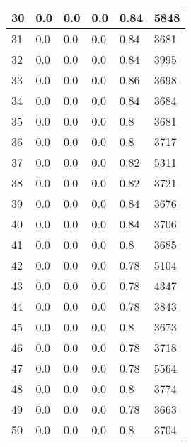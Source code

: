 \begin{longtable}{|l|l|l|l|l|l|}
30 & 0.0 & 0.0 & 0.0 & 0.84 & 5848 \\ \hline 
31 & 0.0 & 0.0 & 0.0 & 0.84 & 3681 \\ \hline 
32 & 0.0 & 0.0 & 0.0 & 0.84 & 3995 \\ \hline 
33 & 0.0 & 0.0 & 0.0 & 0.86 & 3698 \\ \hline 
34 & 0.0 & 0.0 & 0.0 & 0.84 & 3684 \\ \hline 
35 & 0.0 & 0.0 & 0.0 & 0.8 & 3681 \\ \hline 
36 & 0.0 & 0.0 & 0.0 & 0.8 & 3717 \\ \hline 
37 & 0.0 & 0.0 & 0.0 & 0.82 & 5311 \\ \hline 
38 & 0.0 & 0.0 & 0.0 & 0.82 & 3721 \\ \hline 
39 & 0.0 & 0.0 & 0.0 & 0.84 & 3676 \\ \hline 
40 & 0.0 & 0.0 & 0.0 & 0.84 & 3706 \\ \hline 
41 & 0.0 & 0.0 & 0.0 & 0.8 & 3685 \\ \hline 
42 & 0.0 & 0.0 & 0.0 & 0.78 & 5104 \\ \hline 
43 & 0.0 & 0.0 & 0.0 & 0.78 & 4347 \\ \hline 
44 & 0.0 & 0.0 & 0.0 & 0.78 & 3843 \\ \hline 
45 & 0.0 & 0.0 & 0.0 & 0.8 & 3673 \\ \hline 
46 & 0.0 & 0.0 & 0.0 & 0.78 & 3718 \\ \hline 
47 & 0.0 & 0.0 & 0.0 & 0.78 & 5564 \\ \hline 
48 & 0.0 & 0.0 & 0.0 & 0.8 & 3774 \\ \hline 
49 & 0.0 & 0.0 & 0.0 & 0.78 & 3663 \\ \hline 
50 & 0.0 & 0.0 & 0.0 & 0.8 & 3704 \\ \hline 
\end{longtable}